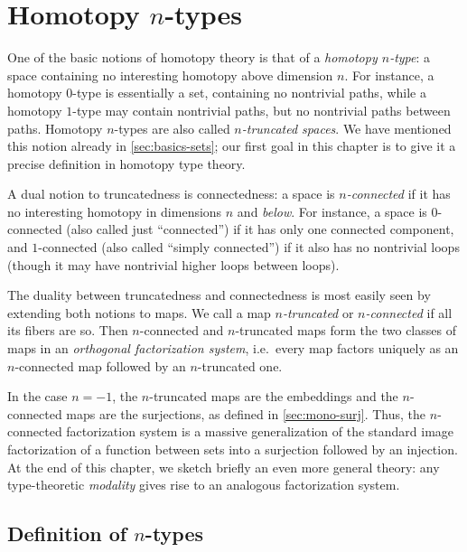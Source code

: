 \chapter{Homotopy \texorpdfstring{$n$}{n}-types}
\label{cha:hlevels}

%

One of the basic notions of homotopy theory is that of a \emph{homotopy $n$-type}: a space containing no interesting homotopy above dimension $n$.
For instance, a homotopy $0$-type is essentially a set, containing no nontrivial paths, while a homotopy $1$-type may contain nontrivial paths, but no nontrivial paths between paths.
Homotopy $n$-types are also called \emph{$n$-truncated spaces}.
We have mentioned this notion already in \autoref{sec:basics-sets}; our first goal in this chapter is to give it a precise definition in homotopy type theory.

A dual notion to truncatedness is connectedness: a space is \emph{$n$-connected} if it has no interesting homotopy in dimensions $n$ and \emph{below}.
For instance, a space is $0$-connected (also called just ``connected'') if it has only one connected component, and $1$-connected (also called ``simply connected'') if it also has no nontrivial loops (though it may have nontrivial higher loops between loops).

The duality between truncatedness and connectedness is most easily seen by extending both notions to maps.
We call a map \emph{$n$-truncated} or \emph{$n$-connected} if all its fibers are so.
Then $n$-connected and $n$-truncated maps form the two classes of maps in an \emph{orthogonal factorization system},
i.e.\ every map factors uniquely as an $n$-connected map followed by an $n$-truncated one.

In the case $n={-1}$, the $n$-truncated maps are the embeddings and the $n$-connected maps are the surjections, as defined in \autoref{sec:mono-surj}.
Thus, the $n$-connected factorization system is a massive generalization of the standard image factorization of a function between sets into a surjection followed by an injection.
At the end of this chapter, we sketch briefly an even more general theory: any type-theoretic \emph{modality} gives rise to an analogous factorization system.


\section{Definition of \texorpdfstring{$n$}{n}-types}
\label{sec:n-types}

